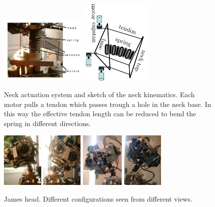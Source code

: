 \documentclass[conference]{IEEEtran}
\numberwithin{equation}{section}
\begin{document}
\begin{figure}[tbp]
\centering
\includegraphics[width=43mm]{image/HeadAct.pdf} 
\includegraphics[width=33mm, angle=90]{image/NeckModelScheme.pdf} 
\caption{Neck actuation system and sketch of the neck kinematics. Each motor pulls a tendon which passes trough a hole in the neck base. In this way the effective tendon length can be reduced to bend the spring in different directions.}
\label{Fig:HeadAct}
\end{figure}

\begin{figure}[tbp]
\centering
\includegraphics[width=20mm]{image/HeadRight.jpg} \hspace{1pt}
\includegraphics[width=20mm]{image/HeadLeft.jpg} \hspace{1pt}
\includegraphics[width=21mm]{image/HeadAhead.jpg} \hspace{1pt}
\includegraphics[width=20mm]{image/HeadBack.jpg} \hspace{1pt}\\

\caption{James head. Different configurations seen from different views.}
\label{Fig:HeadPos}
\end{figure}
\end{document}
